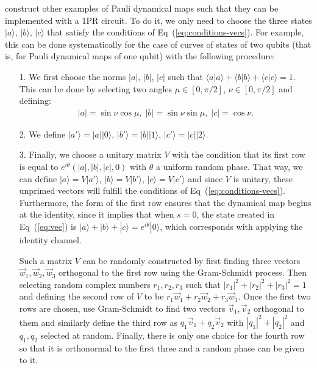 \documentclass[10pt,letterpaper]{article} %
\newcommand{\eref}[1]{Eq~(\ref{#1})}
\providecommand{\DIFaddtex}[1]{{\protect\color{blue}\uwave{#1}}} %
\providecommand{\DIFaddend}{} %
\providecommand{\DIFadd}[1]{\texorpdfstring{\DIFaddtex{#1}}{#1}} %
\DeclareRobustCommand{\DIFaddend}{\DIFOaddend \let\includegraphics\DIFOincludegraphics} %
\begin{document}
\DIFadd{Furthermore, we can }\DIFaddend construct other examples of 
Pauli dynamical maps such that they
can be implemented with a 1PR circuit.
To do it, we only need to choose the three states $|a\rangle$, $|b\rangle$, $|c\rangle$
that satisfy the conditions of  \eref{eq:conditions-vecs}.
For example, this can be done systematically for the case of curves of states of two qubits
(that is, for Pauli dynamical maps of one qubit)
with the following procedure:
\begin{itemize}
\item[1.] We first choose the norms $|a|$, $|b|$, $|c|$
such that $\langle a| a\rangle + \langle b| b\rangle + \langle c| c\rangle = 1$. 
This can be done by selecting two angles
$\mu \in [0, \pi/2]$, $\nu \in [0,\pi/2]$ and defining:
\begin{align*}
|a| = \sin \nu \cos \mu, \; |b| = \sin \nu \sin \mu , \; |c| = \cos \nu.
\end{align*}
\item[2.] We define $|a'\rangle = |a| |0\rangle$, $|b'\rangle = |b| |1\rangle$, $|c'\rangle = |c| |2\rangle$.
\item[3.] 
Finally, we choose a unitary matrix $V$ with the condition that its first
row is equal to $e^{i\theta} (|a|,|b|,|c|,0)$
with $\theta$ a uniform random phase.
That way, we can define $|a\rangle = V |a'\rangle$, $|b\rangle = V |b'\rangle$, $|c\rangle = V |c'\rangle$
and since $V$ is unitary, these unprimed vectors will fulfill the conditions of
\eref{eq:conditions-vecs}.
Furthermore, the form of the first row ensures that the dynamical map begins at the identity,
since it implies that when $s=0$, the 
state created in \eref{eq:vec}
is
$|a\rangle + |b\rangle + |c\rangle = e^{i \theta} |0\rangle$,
which  corresponds with applying the identity channel.

Such a matrix $V$ can be randomly constructed by first finding three vectors 
$\vec{w}_1 , \vec{w}_2, \vec{w}_3$ orthogonal to
the first row using the Gram-Schmidt process.  Then selecting random complex
numbers $r_1, r_2, r_3$ such that $|r_1|^2 + |r_2|^2 + |r_3|^2 = 1$ and defining
the second row of $V$ to be $r_1 \vec{w}_1 + r_2 \vec{w}_2 + r_3 \vec{w}_3$.
Once the first two rows are chosen, use Gram-Schmidt to find two vectors
$\vec{v}_1, \vec{v}_2$ orthogonal to 
them and similarly define the third row as $q_1 \vec{v}_1+ q_2 \vec{v}_2$
with $|q_1|^2 + |q_2|^2$ and $q_1,q_2$
selected at random. 
Finally, there is only one choice for the fourth row so that it is 
orthonormal to the first three
and a random phase can be given to it.
\end{itemize}
\end{document}

